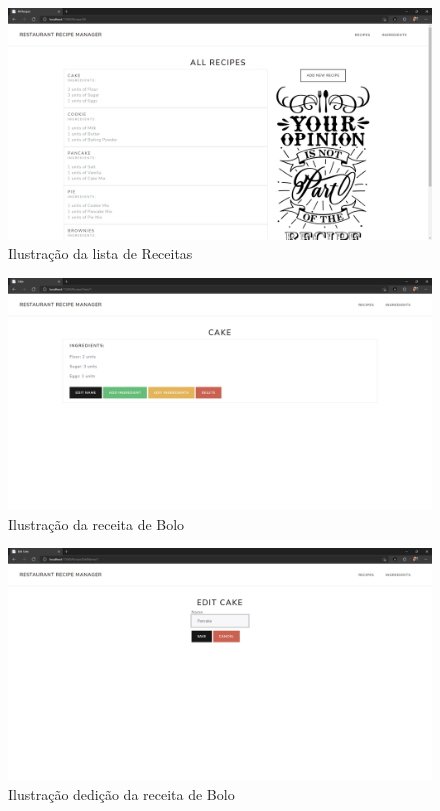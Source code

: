 \begin{figure}[!hbt]
    \centering
    \includegraphics[width=14cm]{Resources/WebApp/Recipes/recipe (1).png}
    \caption{Ilustração da lista de Receitas}
    \label{fig:app_rec_1}
\end{figure}
\FloatBarrier
\begin{figure}[!hbt]
    \centering
    \includegraphics[width=14cm]{Resources/WebApp/Recipes/recipe (2).png}
    \caption{Ilustração da receita de Bolo}
    \label{fig:app_rec_2}
\end{figure}
\FloatBarrier
\begin{figure}[!hbt]
    \centering
    \includegraphics[width=14cm]{Resources/WebApp/Recipes/recipe (3).png}
    \caption{Ilustração dedição da receita de Bolo}
    \label{fig:app_rec_3}
\end{figure}

